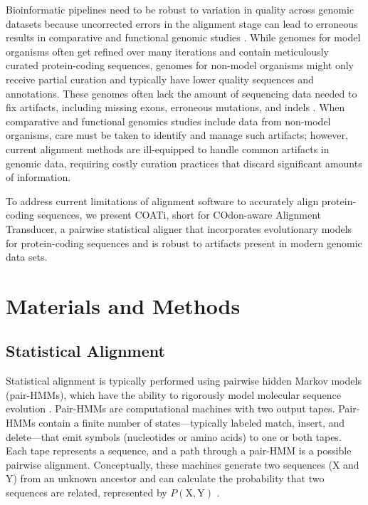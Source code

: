 \documentclass[12pt,letterpaper]{article}
\begin{document}
Bioinformatic pipelines need to be robust to variation in quality across genomic datasets because uncorrected errors in the alignment stage can lead to erroneous results in comparative and functional genomic studies \citep{estimates_schneider_2009, effect_fletcher_2010, hubisz2011error}.
While genomes for model organisms often get refined over many iterations and contain meticulously curated protein-coding sequences, 
genomes for non-model organisms might only receive partial curation and typically have lower quality sequences and annotations.
These genomes often lack the amount of sequencing data needed to fix artifacts, including missing exons, erroneous mutations, and indels \citep{jackman2018tigmint}.
%
When comparative and functional genomics studies include data from non-model organisms, care must be taken to identify and manage such artifacts; however,
current alignment methods are ill-equipped to handle common artifacts in genomic data, requiring costly curation practices that discard significant amounts of information.

To address current limitations of alignment software to accurately align protein-coding sequences, we present COATi, short for COdon-aware Alignment Transducer, a pairwise statistical aligner that incorporates evolutionary models for protein-coding sequences and is robust to artifacts present in modern genomic data sets.


\section*{Materials and Methods}

\subsection*{Statistical Alignment}

Statistical alignment is typically performed using pairwise hidden Markov models (pair-HMMs), which have the ability to rigorously model molecular sequence evolution \citep{bradley2007transducers}.
Pair-HMMs are computational machines with two output tapes. Pair-HMMs contain a finite number of states---typically labeled match, insert, and delete---that emit symbols (nucleotides or amino acids) to one or both tapes.
Each tape represents a sequence, and a path through a pair-HMM is a possible pairwise alignment.
Conceptually, these machines generate two sequences ($\text{X}$ and $\text{Y}$) from an unknown ancestor and can calculate the probability that two sequences are related, represented by $P(\text{X}, \text{Y})$ \citep{yoon_2009_hmm}.
\end{document}
